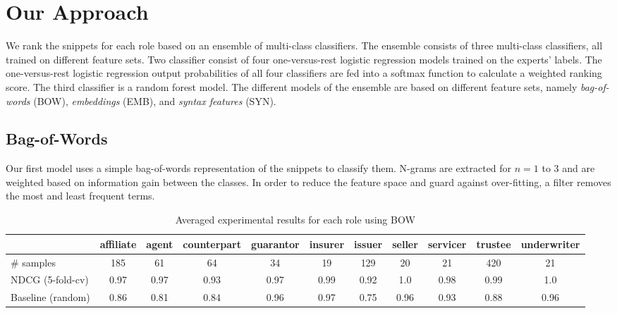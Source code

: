 \section{Our Approach}
We rank the snippets for each role based on an ensemble of multi-class classifiers.
The ensemble consists of three multi-class classifiers, all trained on different feature sets.
Two classifier consist of four one-versus-rest logistic regression models trained on the experts' labels.
The one-versus-rest logistic regression output probabilities of all four classifiers are fed into a softmax function to calculate a weighted ranking score.
The third classifier is a random forest model.
The different models of the ensemble are based on different feature sets, namely \emph{bag-of-words} (BOW), \emph{embeddings} (EMB), and \emph{syntax features} (SYN).


\subsection{Bag-of-Words}

Our first model uses a simple bag-of-words representation of the snippets to classify them.
N-grams are extracted for $n=1$ to $3$ and are weighted based on information gain between the classes.
In order to reduce the feature space and guard against over-fitting, a filter removes the most and least frequent terms.

\begin{table}[tb]
	\caption{Averaged experimental results for each role using BOW}
	\label{tab:roleresults}
	\begin{tabular}{lcccccccccc}
		\toprule
		& affiliate & agent & counterpart & guarantor & insurer & issuer & seller & servicer & trustee & underwriter \\
		\midrule
               \# samples        & 185  & 61   & 64   & 34   & 19   & 129  & 20   & 21   & 420  & 21   \\
               NDCG (5-fold-cv)   & 0.97 & 0.97 & 0.93 & 0.97 & 0.99 & 0.92 & 1.0  & 0.98 & 0.99 & 1.0  \\
               Baseline (random) & 0.86 & 0.81 & 0.84 & 0.96 & 0.97 & 0.75 & 0.96 & 0.93 & 0.88 & 0.96 \\
		\bottomrule
	\end{tabular}
\end{table}

